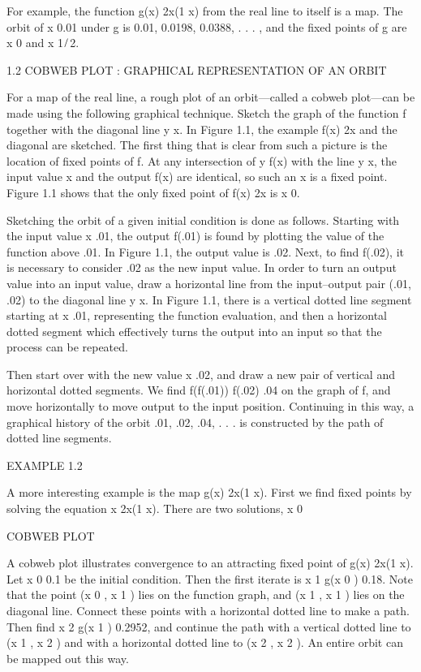 For example, the function g(x)  2x(1  x) from the real line to itself is a map. The orbit of x  0.01 under 
g is 0.01, 0.0198, 0.0388, . . .  , and the ﬁxed points of g are x  0 and x  1 ̸ 2.

1.2 COBWEB PLOT : GRAPHICAL REPRESENTATION OF AN ORBIT

For a map of the real line, a rough plot of an orbit—called a cobweb plot—can be made using the following 
graphical technique. Sketch the graph of the function f together with the diagonal line y  x. In Figure 
1.1, the example f(x)  2x and the diagonal are sketched. The ﬁrst thing that is clear from such a picture 
is the location of ﬁxed points of f. At any intersection of y  f(x) with the line y  x,
the input value x and the output f(x) are identical, so such an x is a ﬁxed point. Figure 1.1 shows that 
the only ﬁxed point of f(x)  2x is x  0.

Sketching the orbit of a given initial condition is done as follows. Starting with the input value x  .01, 
the output f(.01) is found by plotting the value of the function above .01. In Figure 1.1, the output value 
is .02. Next, to ﬁnd f(.02), it is necessary to consider .02 as the new input value. In order to turn an 
output value into an input value, draw a horizontal line from the input–output pair (.01, .02) to the 
diagonal line y  x. In Figure 1.1, there is a vertical dotted line segment starting at x  .01, representing 
the function evaluation, and then a horizontal dotted segment which effectively turns the output into an 
input so that the process can be repeated.

Then start over with the new value x  .02, and draw a new pair of vertical and horizontal dotted segments. 
We ﬁnd f(f(.01))  f(.02)  .04 on the graph of f, and move horizontally to move output to the input 
position. Continuing in this way, a graphical history of the orbit .01, .02, .04, . . .  is constructed by 
the path of dotted line segments.

EXAMPLE 1.2

A more interesting example is the map g(x)  2x(1  x). First we ﬁnd ﬁxed points by solving the equation x  
2x(1  x). There are two solutions, x  0

COBWEB PLOT

A cobweb plot illustrates convergence to an attracting ﬁxed point of g(x)  2x(1  x). Let x 0  0.1 be the 
initial condition. Then the ﬁrst iterate is x 1  g(x 0 )  0.18. Note that the point (x 0 , x 1 ) lies on 
the function graph, and (x 1 , x 1 ) lies on the diagonal line. Connect these points with a horizontal 
dotted line to make a path. Then ﬁnd x 2  g(x 1 )  0.2952, and continue the path with a vertical dotted 
line to (x 1 , x 2 ) and with a horizontal dotted line to (x 2 , x 2 ). An entire orbit can be mapped out 
this way.

